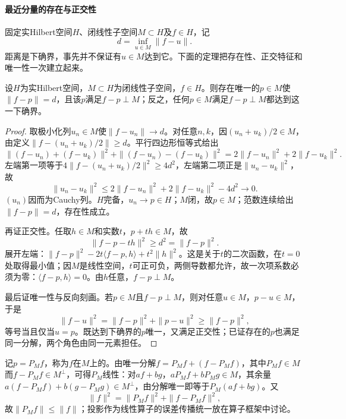 \paragraph{最近分量的存在与正交性}

固定实Hilbert空间$H$、闭线性子空间$M\subset H$及$f\in H$，记
\[
d=\inf_{u\in M}\|f-u\|.
\]
距离是下确界，事先并不保证有$u\in M$达到它。下面的定理把存在性、正交特征和唯一性一次建立起来。

\begin{theorem}[正交投影]
\label{thm:orthogonal-projection}
设$H$为实Hilbert空间，$M\subset H$为闭线性子空间，$f\in H$。则存在唯一的$p\in M$使$\|f-p\|=d$，且该$p$满足$f-p\perp M$；反之，任何$p\in M$满足$f-p\perp M$都达到这一下确界。
\end{theorem}

\begin{proof}
取极小化列$u_n\in M$使$\|f-u_n\|\to d$。对任意$n,k$，因$(u_n+u_k)/2\in M$，由定义$\|f-(u_n+u_k)/2\|\ge d$。平行四边形恒等式给出
\[
\|(f-u_n)+(f-u_k)\|^2+\|(f-u_n)-(f-u_k)\|^2
=2\|f-u_n\|^2+2\|f-u_k\|^2.
\]
左端第一项等于$4\|f-(u_n+u_k)/2\|^2\ge 4d^2$，左端第二项正是$\|u_n-u_k\|^2$，故
\[
\|u_n-u_k\|^2\le 2\|f-u_n\|^2+2\|f-u_k\|^2-4d^2\longrightarrow0.
\]
$(u_n)$因而为Cauchy列。$H$完备，$u_n\to p\in H$；$M$闭，故$p\in M$；范数连续给出$\|f-p\|=d$，存在性成立。

再证正交性。任取$h\in M$和实数$t$，$p+th\in M$，故
\[
\|f-p-th\|^2\ge d^2=\|f-p\|^2.
\]
展开左端：$\|f-p\|^2-2t\langle f-p,h\rangle+t^2\|h\|^2$。这是关于$t$的二次函数，在$t=0$处取得最小值；因$M$是线性空间，$t$可正可负，两侧导数都允许，故一次项系数必须为零：$\langle f-p,h\rangle=0$。由$h$任意，$f-p\perp M$。

最后证唯一性与反向刻画。若$p\in M$且$f-p\perp M$，则对任意$u\in M$，$p-u\in M$，于是
\[
\|f-u\|^2=\|f-p\|^2+\|p-u\|^2\ge\|f-p\|^2,
\]
等号当且仅当$u=p$。既达到下确界的$p$唯一，又满足正交性；已证存在的$p$也满足同一分解，两个角色由同一元素担任。
\end{proof}

记$p=P_Mf$，称为$f$在$M$上的。由唯一分解$f=P_Mf+(f-P_Mf)$，其中$P_Mf\in M$而$f-P_Mf\in M^\perp$，可得$P_M$线性：对$af+bg$，$aP_Mf+bP_Mg\in M$，其余量$a(f-P_Mf)+b(g-P_Mg)\in M^\perp$，由分解唯一即等于$P_M(af+bg)$。又
\begin{equation}
\label{eq:functional-projection-error-decomposition}
\|f\|^2=\|P_Mf\|^2+\|f-P_Mf\|^2,
\end{equation}
故$\|P_Mf\|\le\|f\|$；投影作为线性算子的误差传播统一放在算子框架中讨论。

